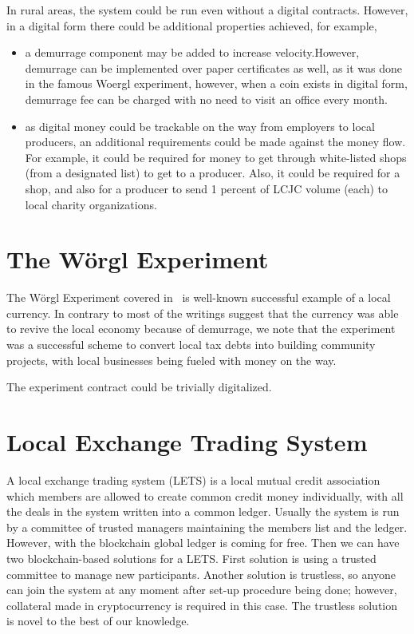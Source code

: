\documentclass[]{llncs}   %
\begin{document}
In rural areas, the system could be run even without a digital contracts. However, in a digital form there could be
additional properties achieved, for example,
    \begin{itemize}
        \item{} a demurrage component may be added to increase velocity.However, demurrage can be implemented over paper 
        certificates as well, as it was done in the famous Woergl experiment, however, when a coin exists in digital form,
         demurrage fee can be charged with no need to visit an office every month.
        \item{} as digital money could be trackable on the way from employers to local producers, an additional
        requirements could be made against the money flow. For example, it could be required for money to get through
        white-listed shops (from a designated list) to get to a producer. Also, it could be required for a shop, and also for a
        producer to send 1 percent of LCJC volume (each) to local charity organizations.
    \end{itemize}

\section{The W\"{o}rgl Experiment}
\label{sec-worgl}

The W\"{o}rgl Experiment covered in~\cite{muralt1934woergl} is well-known successful example of a local currency. In
contrary to most of the writings suggest that the currency was able to revive the local economy because of demurrage, we
 note that the experiment was a successful scheme to convert local tax debts into building community projects, with
 local businesses being fueled with money on the way.

The experiment contract could be trivially digitalized.

\section{Local Exchange Trading System}
\label{sec-lets}

A local exchange trading system (LETS)\cite{williams1996local} is a local mutual credit association which members are allowed to create common credit money individually, with all the deals in the system written into a common ledger. Usually the system is run by a committee of 
trusted managers maintaining the members list and the ledger. However, with the blockchain global ledger is coming for free. Then 
we can have two blockchain-based solutions for a LETS. First solution is using a trusted committee to manage new participants. Another 
solution is trustless, so anyone can join the system at any moment after set-up procedure being done; however, collateral made in cryptocurrency is required in this case. The trustless solution is novel to the best of our knowledge.
\end{document}
